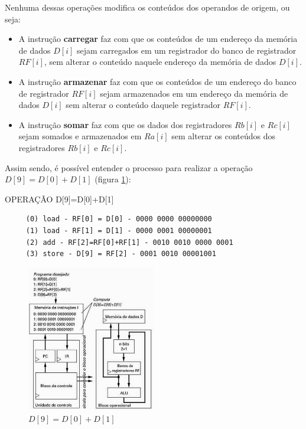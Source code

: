 \documentclass{article}
\begin{document}
Nenhuma dessas operações modifica os conteúdos dos operandos de origem, ou seja:
\begin{itemize}
     \item A instrução \textbf{carregar} faz com que os conteúdos de um endereço da memória  de dados $D[i]$ sejam carregados em um registrador do banco de registrador $RF[i]$, sem alterar o conteúdo naquele endereço da memória de dados $D[i]$.
     \item A instrução \textbf{armazenar} faz com que os conteúdos de um endereço do banco de registrador $RF[i]$ sejam armazenados em um endereço da memória de dados $D[i]$ sem alterar o conteúdo daquele registrador $RF[i]$.
     \item A instrução \textbf{somar} faz com que os dados dos registradores $Rb[i]$ e $Rc[i]$ sejam somados e armazenados em $Ra[i]$ sem alterar os conteúdos dos registradores  $Rb[i]$ e $Rc[i]$.
\end{itemize}

Assim sendo, é possível entender o processo para realizar a operação $D[9]=D[0]+D[1]$ (figura \ref{fig:OperaçãoD9D0D1}):
\begin{boxedd}{OPERAÇÃO D[9]=D[0]+D[1]}
     \begin{lstlisting}
     (0) load - RF[0] = D[0] - 0000 0000 00000000
     (1) load - RF[1] = D[1] - 0000 0001 00000001
     (2) add - RF[2]=RF[0]+RF[1] - 0010 0010 0000 0001
     (3) store - D[9] = RF[2] - 0001 0010 00001001
     \end{lstlisting}  
\end{boxedd}

\begin{figure}[h!] 
    \centering 
    \includegraphics[width=0.5\textwidth]{d9equalsd0plusd1.jpg} 
    \caption{$D[9]=D[0]+D[1]$} 
    \label{fig:OperaçãoD9D0D1} 
\end{figure}
\end{document}

